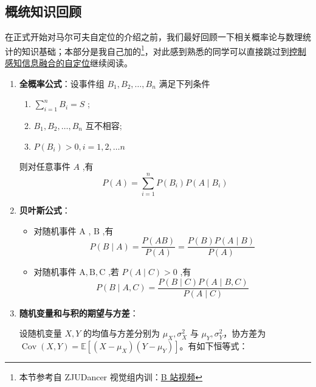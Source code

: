 \documentclass[../main.tex]{subfiles}
\begin{document}
\subsection*{概统知识回顾}
在正式开始对马尔可夫自定位的介绍之前，我们最好回顾一下相关概率论与数理统计的知识基础；本部分是我自己加的\footnote{本节参考自 ZJUDancer 视觉组内训：\href{https://www.bilibili.com/video/BV1wUmPYCERx/?spm_id_from=333.337.search-card.all.click&vd_source=5deca47094767260f853b759a625a68f}{B 站视频}}，对此感到熟悉的同学可以直接跳过到\hyperref[sec:markov]{控制感知信息融合的自定位}继续阅读。
    \begin{enumerate}
        \item \textbf{全概率公式}：设事件组 \( {B}_{1},{B}_{2},\ldots ,{B}_{n} \) 满足下列条件
        \begin{enumerate}
            \item \( \mathop{\sum }\limits_{{i = 1}}^{n}{B}_{i} = S \) ;
            \item \( {B}_{1},{B}_{2},\ldots ,{B}_{n} \) 互不相容;
            \item \( P\left( {B}_{i}\right)  > 0,i = 1,2,\ldots n \)
        \end{enumerate}
        则对任意事件 \( A \) ,有 
        $$ P\left( A\right)  = \mathop{\sum }\limits_{{i = 1}}^{n}P\left( {B}_{i}\right) P\left( {A \mid  {B}_{i}}\right) $$

        \item \textbf{贝叶斯公式}：
        \begin{itemize}
            \item 对随机事件 \( \mathrm{A} \) , \( \mathrm{B} \) ,有
            $$ P\left( {B \mid  A}\right)  = \frac{P\left( {AB}\right) }{P\left( A\right) } = \frac{P\left( B\right) P\left( {A \mid  B}\right) }{P\left( A\right) } $$
            \item 对随机事件 \( \mathrm{A},\mathrm{B},\mathrm{C} \) ,若 \( P\left( {A \mid  C}\right)  > 0 \) ,有
            $$ P\left( {B \mid  A,C}\right)  = \frac{P\left( {B \mid  C}\right) P\left( {A \mid  B,C}\right) }{P\left( {A \mid  C}\right) } $$
        \end{itemize}

        \item \textbf{随机变量和与积的期望与方差}：

    设随机变量 $X,Y$ 的均值与方差分别为 $\mu_X,\sigma_X^2$ 与 $\mu_Y,\sigma_Y^2$，协方差为
    $\operatorname{Cov}(X,Y)=\mathbb{E}[(X-\mu_X)(Y-\mu_Y)]$。有如下恒等式：
    

\end{enumerate}
\end{document}
